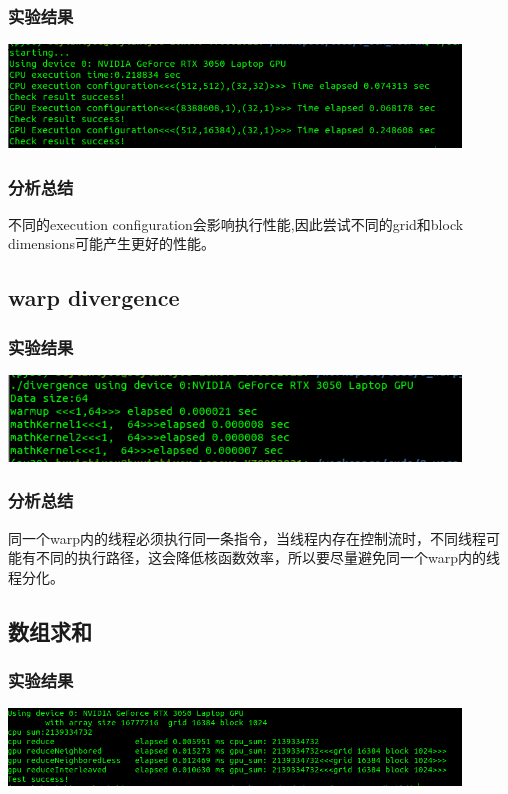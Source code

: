 \subsubsection{实验结果}
\noindent
\includegraphics[width=0.9\textwidth]{assets/matrix.png}
\subsubsection{分析总结}
\noindent
不同的execution configuration会影响执行性能,因此尝试不同的grid和block dimensions可能产生更好的性能。

\subsection{warp divergence}
\subsubsection{实验结果}
\noindent
\includegraphics[width=0.9\textwidth]{assets/warp_d.png}
\subsubsection{分析总结}
\noindent
同一个warp内的线程必须执行同一条指令，当线程内存在控制流时，不同线程可能有不同的执行路径，这会降低核函数效率，所以要尽量避免同一个warp内的线程分化。

\subsection{数组求和}
\subsubsection{实验结果}
\noindent
\includegraphics[width=0.9\textwidth]{assets/sum.png}
